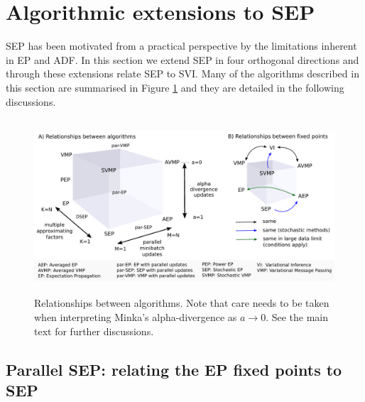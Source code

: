 \section{Algorithmic extensions to SEP}
%
SEP has been motivated from a practical perspective by the limitations inherent in EP and ADF. In this section we extend SEP in four orthogonal directions and through these extensions relate SEP to SVI. Many of the algorithms described in this section are summarised in Figure \ref{fig:relationship-algorithms} and they are detailed in the following discussions.

\begin{figure}
\centering
\def\svgwidth{1\linewidth}
\includegraphics[height=6.5cm]{Chapter3/sep/fig/relationship-algorithms.pdf}%
\caption{Relationships between algorithms. Note that care needs to be taken when interpreting Minka's alpha-divergence as $a \rightarrow 0$. See the main text for further discussions.}
\label{fig:relationship-algorithms}
\end{figure}

%
\subsection{Parallel SEP: relating the EP fixed points to SEP}
%

